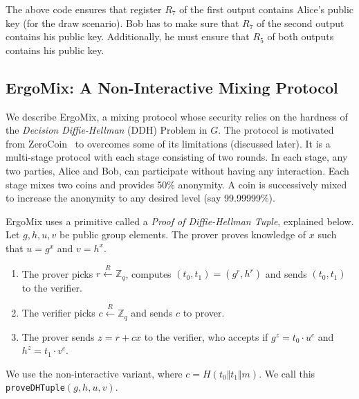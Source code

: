 \documentclass[11pt]{article}
\newcommand{\mixname}{ErgoMix\xspace}
\begin{document}

The above code ensures that register $R_7$ of the first output contains Alice's public key (for the draw scenario). Bob has to make sure that $R_7$ of the second output contains his public key. Additionally, he must ensure that $R_5$ of both outputs contains his public key.

\subsection{\mixname: A Non-Interactive Mixing Protocol}
\label{mix}

We describe \mixname, a mixing protocol whose security relies on the hardness of the {\em Decision Diffie-Hellman} (DDH) Problem in $G$. The protocol is motivated from ZeroCoin~\cite{zerocoin} to overcomes some of its limitations (discussed later). It is a multi-stage protocol with each stage consisting of two rounds. In each stage, any two parties, Alice and Bob, can participate without having any interaction. Each stage mixes two coins and provides 50\% anonymity. A coin is successively mixed to increase the anonymity to any desired level (say 99.99999\%). 

\mixname uses a primitive called a {\em Proof of Diffie-Hellman Tuple}, explained below. Let $g, h, u, v$ be public group elements. The prover proves knowledge of $x$ such that $u={g}^x$ and $v={h}^x$. 
	\begin{enumerate}
		\item The prover picks $r \stackrel{R}{\leftarrow} \mathbb{Z}_q$, computes $(t_0, t_1) = ({g}^r, {h}^r)$ and sends $(t_0, t_1)$ to the verifier.
		\item The verifier picks $c \stackrel{R}{\leftarrow} \mathbb{Z}_q$ and sends $c$ to prover.
		\item The prover sends $z = r + cx$ to the verifier, who accepts if ${g}^z = {t_0}\cdot {u}^c$ and $h^z=t_1\cdot v^c$. %
	\end{enumerate}
	We use the non-interactive variant, where $c = H(t_0 \Vert t_1\Vert m)$. We call this \texttt{proveDHTuple}$(g, h, u, v)$.
	
\end{document}
